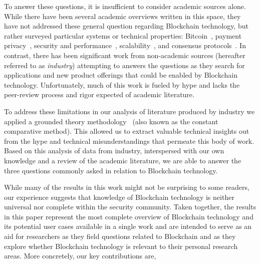 To answer these questions, it is insufficient to consider academic sources alone.
While there have been several academic overviews written in this space, they have not addressed these general question regarding Blockchain technology, but rather surveyed particular systems or technical properties: Bitcoin~\cite{BMC+15,Narayanan17}, payment privacy~\cite{Conti17}, security and performance~\cite{Gervais16}, scalability~\cite{Croman16}, and consensus protocols~\cite{Bano17,garay2018consensus}.
In contrast, there has been significant work from non-academic sources (hereafter referred to as \emph{industry}) attempting to answers the questions as they search for applications and new product offerings that could be enabled by Blockchain technology.
Unfortunately, much of this work is fueled by hype and lacks the peer-review process and rigor expected of academic literature.

To address these limitations in our analysis of literature produced by industry we applied a grounded theory methodology~\cite{glaser1965constant,strauss1990basics,corbin1990grounded} (also known as the constant comparative method).
This allowed us to extract valuable technical insights out from the hype and technical misunderstandings that permeate this body of work.
Based on this analysis of data from industry, interspersed with our own knowledge and a review of the academic literature, we are able to answer the three questions commonly asked in relation to Blockchain technology.

While many of the results in this work might not be surprising to some readers, our experience suggests that knowledge of Blockchain technology is neither universal nor complete within the security community.
Taken together, the results in this paper represent the most complete overview of Blockchain technology and its potential user cases available in a single work and are intended to serve as an aid for researchers as they field questions related to Blockchain and as they explore whether Blockchain technology is relevant to their personal research areas.%
More concretely, our key contributions are,

